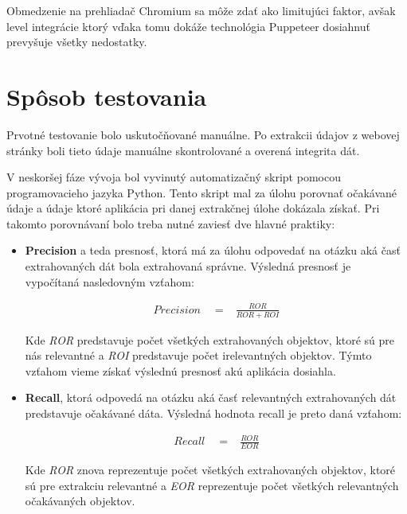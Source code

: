 Obmedzenie na prehliadač Chromium sa môže zdať ako limitujúci faktor, avšak level integrácie ktorý vďaka tomu dokáže technológia Puppeteer dosiahnuť prevyšuje všetky nedostatky.

\section{Spôsob testovania}
\label{sposobytestu}

Prvotné testovanie bolo uskutočňované manuálne. Po extrakcii údajov z webovej stránky boli tieto údaje manuálne skontrolované a overená integrita dát. 

V neskoršej fáze vývoja bol vyvinutý automatizačný skript pomocou programovacieho jazyka Python. Tento skript mal za úlohu porovnať očakávané údaje a údaje ktoré aplikácia pri danej extrakčnej úlohe dokázala získať. Pri takomto porovnávaní bolo treba nutné zaviesť dve hlavné praktiky\cite{precrecall}:

\begin{itemize}
    \item \textbf{Precision} a teda presnosť, ktorá má za úlohu odpovedať na otázku aká časť extrahovaných dát bola extrahovaná správne. Výsledná presnosť je vypočítaná nasledovným vzťahom:
    
    \begin{eqnarray}
    Precision \quad = & {\displaystyle\frac{ROR}{ROR + ROI}}
    \end{eqnarray}
   
    Kde \textit{ROR} predstavuje počet všetkých extrahovaných objektov, ktoré sú pre nás relevantné a \textit{ROI} predstavuje počet irelevantných objektov. Týmto vzťahom vieme získať výslednú presnosť akú aplikácia dosiahla.
    
    \item \textbf{Recall}, ktorá odpovedá na otázku aká časť relevantných extrahovaných dát predstavuje očakávané dáta. Výsledná hodnota recall je preto daná vzťahom:
    
    \begin{eqnarray}
    Recall \quad = & {\displaystyle\frac{ROR}{EOR}}
    \end{eqnarray}
    
    Kde \textit{ROR} znova reprezentuje počet všetkých extrahovaných objektov, ktoré sú pre extrakciu relevantné a \textit{EOR} reprezentuje počet všetkých relevantných očakávaných objektov.
\end{itemize}

\bigskip

